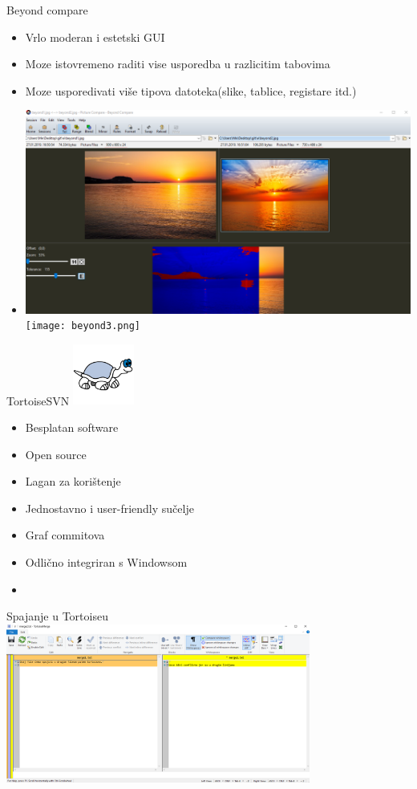 \documentclass[10pt]{beamer}
\begin{document}
\begin{frame}{Beyond compare}
	\begin{itemize}
		\item Vrlo moderan i estetski GUI
		\item Moze istovremeno raditi vise usporedba u razlicitim tabovima
		\item Moze usporedivati više tipova datoteka(slike, tablice, registare itd.)
		\item 
		\includegraphics{beyond.png}
		\texttt{[image: beyond3.png]}
	\end{itemize}
\end{frame}

\begin{frame}{TortoiseSVN}
\includegraphics[width=2cm, height=2cm]{tortoise4.png}
\begin{itemize}
    \item Besplatan software
    \item Open source
    \item Lagan za korištenje
    \item Jednostavno i user-friendly sučelje
    \item Graf commitova
    \item Odlično integriran s Windowsom
    \item \cite{tort}
\end{itemize}
\end{frame}

\begin{frame}{Spajanje u Tortoiseu}
\includegraphics[width=10cm]{tortoise1.png}
\end{frame}
\end{document}
